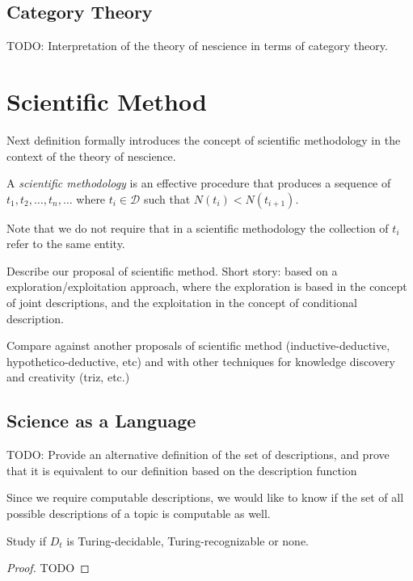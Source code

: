 %
%

\subsection{Category Theory}

{\color{red} TODO: Interpretation of the theory of nescience in terms of category theory.}


%
%

\section{Scientific Method}

Next definition formally introduces the concept of scientific methodology in the context of the theory of nescience.

\begin{definition}
A \emph{scientific methodology} is an effective procedure that produces a sequence of $t_1, t_2, \ldots, t_n, \ldots$ where $t_i \in \mathcal{D}$ such that $N(t_i) < N(t_{i+1})$.
\end{definition}

Note that we do not require that in a scientific methodology the collection of $t_i$ refer to the same entity.


{\color{red} Describe our proposal of scientific method. Short story: based on a exploration/exploitation approach, where the exploration is based in the concept of joint descriptions, and the exploitation in the concept of conditional description.}

{\color{red} Compare against another proposals of scientific method (inductive-deductive, hypothetico-deductive, etc) and with other techniques for knowledge discovery and creativity (triz, etc.)}

\subsection{Science as a Language}

{\color{red} TODO: Provide an alternative definition of the set of descriptions, and prove that it is equivalent to our definition based on the description function}

Since we require computable descriptions, we would like to know if the set of all possible descriptions of a topic is computable as well.

\begin{proposition}
Study if $D_{t}$ is Turing-decidable, Turing-recognizable or none.
\end{proposition}
\begin{proof}
{\color{red} TODO}
\end{proof}

